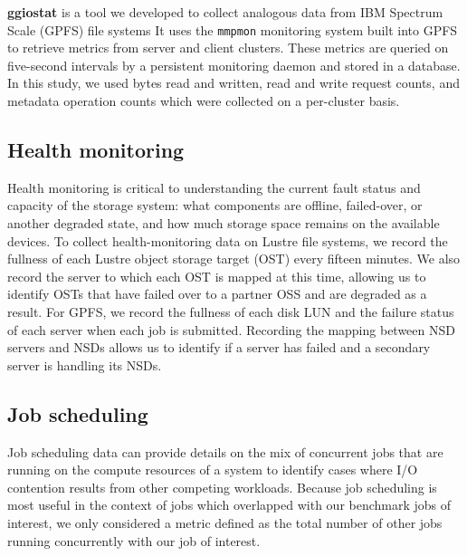 \label{sec:methods/ggiostat}
\textbf{ggiostat} is a tool we developed 
to collect analogous data from IBM Spectrum Scale (GPFS) file systems %
It uses the \texttt{mmpmon} monitoring system built into GPFS to retrieve metrics from server and client clusters.
These metrics are queried on five-second intervals by a persistent monitoring daemon and stored in a database.
In this study, we used bytes read and written, read and write request counts, and metadata operation counts which were collected on a per-cluster basis.

\subsection{Health monitoring} \label{sec:methods/health}

Health monitoring is critical to understanding the current fault status and capacity of the
storage system: what components are offline, failed-over, or another degraded state, and how much storage space remains on the available devices.
To collect health-monitoring data on Lustre file systems, we record the fullness of each Lustre object storage target (OST) every fifteen minutes.
We also record the server to which each OST is mapped at this time, allowing us to identify OSTs that have failed over to a partner OSS and are degraded as a result.
For GPFS, we record the fullness of each disk LUN and the failure status of each server when each job is submitted.
Recording the mapping between NSD servers and NSDs allows us to identify if a server has failed and a secondary server is handling its NSDs.

\subsection{Job scheduling} \label{sec:methods/scheduling}

Job scheduling data can provide details on the mix of concurrent jobs that are running on the compute resources of a system to identify cases where I/O contention results from other competing workloads.
Because job scheduling is most useful in the context of jobs which overlapped with our benchmark jobs of interest, we only considered a metric defined as the total number of other jobs running concurrently with our job of interest.

